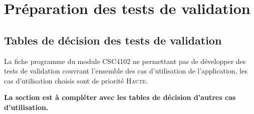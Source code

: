 \documentclass[11pt,article]{article}
\begin{document}
\newpage

\section{Préparation des tests de validation}

\subsection{Tables de décision des tests de validation}

La fiche programme du module CSC4102 ne permettant pas de développer
des tests de validation couvrant l'ensemble des cas d'utilisation de
l'application, les cas d'utilisation choisis sont de priorité
\textsc{Haute}.

{\color{red}\textbf{La section est à compléter avec les tables de
    décision d'autres cas d'utilisation.}}
\end{document}
